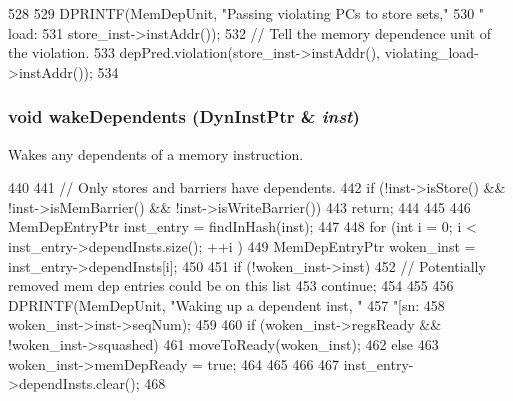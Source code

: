 \begin{DoxyCode}
528 {
529     DPRINTF(MemDepUnit, "Passing violating PCs to store sets,"
530             " load: %
531             store_inst->instAddr());
532     // Tell the memory dependence unit of the violation.
533     depPred.violation(store_inst->instAddr(), violating_load->instAddr());
534 }
\end{DoxyCode}
\hypertarget{classMemDepUnit_a84834d31005dcede47e334bfee5b52d3}{
\subsubsection[{wakeDependents}]{\setlength{\rightskip}{0pt plus 5cm}void wakeDependents ({\bf DynInstPtr} \& {\em inst})}}
\label{classMemDepUnit_a84834d31005dcede47e334bfee5b52d3}
Wakes any dependents of a memory instruction. 


\begin{DoxyCode}
440 {
441     // Only stores and barriers have dependents.
442     if (!inst->isStore() && !inst->isMemBarrier() && !inst->isWriteBarrier()) {
443         return;
444     }
445 
446     MemDepEntryPtr inst_entry = findInHash(inst);
447 
448     for (int i = 0; i < inst_entry->dependInsts.size(); ++i ) {
449         MemDepEntryPtr woken_inst = inst_entry->dependInsts[i];
450 
451         if (!woken_inst->inst) {
452             // Potentially removed mem dep entries could be on this list
453             continue;
454         }
455 
456         DPRINTF(MemDepUnit, "Waking up a dependent inst, "
457                 "[sn:%
458                 woken_inst->inst->seqNum);
459 
460         if (woken_inst->regsReady && !woken_inst->squashed) {
461             moveToReady(woken_inst);
462         } else {
463             woken_inst->memDepReady = true;
464         }
465     }
466 
467     inst_entry->dependInsts.clear();
468 }
\end{DoxyCode}


